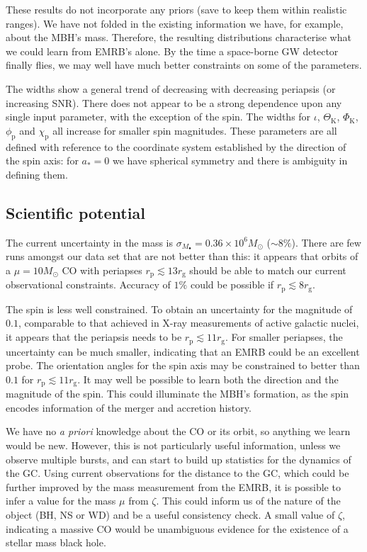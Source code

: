\documentclass[11pt,twoside]{article}
\begin{document}
These results do not incorporate any priors (save to keep them within realistic ranges). We have not folded in the existing information we have, for example, about the MBH's mass. Therefore, the resulting distributions characterise what we could learn from EMRB's alone. By the time a space-borne GW detector finally flies, we may well have much better constraints on some of the parameters.

The widths show a general trend of decreasing with decreasing periapsis (or increasing SNR). There does not appear to be a strong dependence upon any single input parameter, with the exception of the spin. The widths for $\iota$, $\Theta_\mathrm{K}$, $\Phi_\mathrm{K}$, $\phi_\mathrm{p}$ and $\chi_\mathrm{p}$ all increase for smaller spin magnitudes. These parameters are all defined with reference to the coordinate system established by the direction of the spin axis: for $a_\ast = 0$ we have spherical symmetry and there is ambiguity in defining them.

\subsection{Scientific potential}

The current uncertainty in the mass is $\sigma_{M_\bullet} = 0.36 \times 10^6 M_\odot$ ($\sim 8\%$). There are few runs amongst our data set that are not better than this: it appears that orbits of a $\mu = 10 M_\odot$ CO with periapses $r_\mathrm{p} \lesssim 13 r_\mathrm{g}$ should be able to match our current observational constraints. Accuracy of $1\%$ could be possible if $r_\mathrm{p} \lesssim 8 r_\mathrm{g}$.

The spin is less well constrained. To obtain an uncertainty for the magnitude of $0.1$, comparable to that achieved in X-ray measurements of active galactic nuclei, it appears that the periapsis needs to be $r_\mathrm{p} \lesssim 11 r_\mathrm{g}$. For smaller periapses, the uncertainty can be much smaller, indicating that an EMRB could be an excellent probe. The orientation angles for the spin axis may be constrained to better than $0.1$ for $r_\mathrm{p} \lesssim 11 r_\mathrm{g}$. It may well be possible to learn both the direction and the magnitude of the spin. This could illuminate the MBH's formation, as the spin encodes information of the merger and accretion history.

We have no {\it a priori} knowledge about the CO or its orbit, so anything we learn would be new. However, this is not particularly useful information, unless we observe multiple bursts, and can start to build up statistics for the dynamics of the GC. Using current observations for the distance to the GC, which could be further improved by the mass measurement from the EMRB, it is possible to infer a value for the mass $\mu$ from $\zeta$. This could inform us of the nature of the object (BH, NS or WD) and be a useful consistency check. A small value of $\zeta$, indicating a massive CO would be unambiguous evidence for the existence of a stellar mass black hole.



\end{document}
